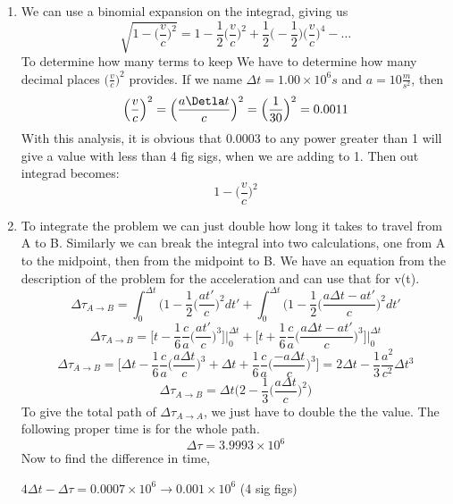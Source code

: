 \documentclass[11pt]{article}
\begin{document}
\begin{enumerate}[label=\alph*)]
    \item 
    We can use a binomial expansion on the integrad, giving us 
    \[\sqrt{1-\Big(\frac{v}{c}\Big)^2} = 1-\frac{1}{2}\Big(\frac{v}{c}\Big)^2 + \frac{1}{2}\Big(-\frac{1}{2}\Big)\Big(\frac{v}{c}\Big)^4-\dots\]
    To determine how many terms to keep We have to determine how many decimal places $\Big(\frac{v}{c}\Big)^2$ provides. If we name $\Delta t = 1.00 \times 10^6 s$ and $a = 10\frac{m}{s^2}$, then
    \[\Big(\frac{v}{c}\Big)^2 = \Big(\frac{a\Detla t}{c}\Big)^2 = \Big(\frac{1}{30}\Big)^2 = 0.0011\]
    With this analysis, it is obvious that $0.0003$ to any power greater than 1 will give a value with less than 4 fig sigs, when we are adding to 1. Then out integrad becomes:
    \[1-\Big(\frac{v}{c}\Big)^2\]
    
    \item To integrate the problem we can just double how long it takes to travel from A to B. Similarly we can break the integral into two calculations, one from A to the midpoint, then from the midpoint to B. We have an equation from the description of the problem for the acceleration and can use that for v(t).
    \[\Delta \tau_{A \rightarrow B}= \int_0^{\Delta t} (1-\frac{1}{2}\Big(\frac{at'}{c}\Big)^2dt'+\int_0^{\Delta t} (1-\frac{1}{2}\Big(\frac{a\Delta t - at'}{c}\Big)^2dt'\]
    \[\Delta \tau_{A \rightarrow B} = \Big[t-\frac{1}{6}\frac{c}{a}\Big(\frac{at'}{c}\Big)^3\Big]\Big|_0^{\Delta t} + \Big[t+\frac{1}{6}\frac{c}{a}\Big(\frac{a\Delta t - at'}{c}\Big)^3\Big]\Big|_0^{\Delta t}\]
    \[\Delta \tau_{A \rightarrow B} = \Big[\Delta t-\frac{1}{6}\frac{c}{a}\Big(\frac{a\Delta t}{c}\Big)^3 + \Delta t+\frac{1}{6}\frac{c}{a}\Big(\frac{-a\Delta t}{c}\Big)^3\Big] = 2\Delta t - \frac{1}{3}\frac{a^2}{c^2}\Delta t^3\]
    \[\Delta \tau_{A \rightarrow B} = \Delta t \Big(2-\frac{1}{3}\Big(\frac{a\Delta t}{c}\Big)^2\Big)\]
    To give the total path of $\Delta \tau_{A \rightarrow A}$, we just have to double the the value. The following proper time is for the whole path.
    \[\Delta \tau = 3.9993\times 10^6\]
    Now to find the difference in time, 
    \begin{center}
            $4\Delta t - \Delta \tau = 0.0007 \times 10^6 \rightarrow 0.001 \times 10^6 $ (4 sig figs)
    \end{center}
    
\end{enumerate}
\end{document}
